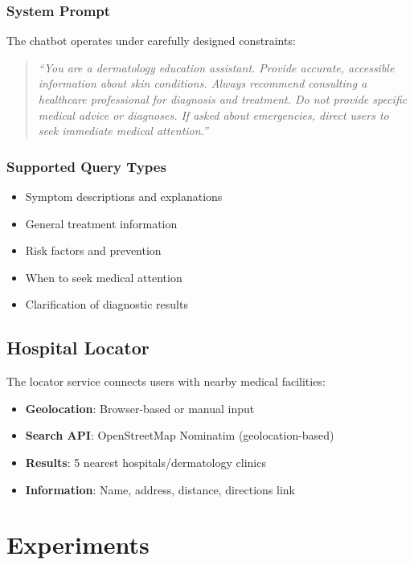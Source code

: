 \documentclass[ai,article,submit,pdftex,moreauthors]{Definitions/mdpi}
\begin{document}
\subsubsection{System Prompt}

The chatbot operates under carefully designed constraints:
\begin{quote}
\textit{``You are a dermatology education assistant. Provide accurate, accessible information about skin conditions. Always recommend consulting a healthcare professional for diagnosis and treatment. Do not provide specific medical advice or diagnoses. If asked about emergencies, direct users to seek immediate medical attention.''}
\end{quote}

\subsubsection{Supported Query Types}
\begin{itemize}[leftmargin=*, itemsep=2pt]
    \item Symptom descriptions and explanations
    \item General treatment information
    \item Risk factors and prevention
    \item When to seek medical attention
    \item Clarification of diagnostic results
\end{itemize}

\subsection{Hospital Locator}

The locator service connects users with nearby medical facilities:
\begin{itemize}[leftmargin=*, itemsep=2pt]
    \item \textbf{Geolocation}: Browser-based or manual input
    \item \textbf{Search API}: OpenStreetMap Nominatim (geolocation-based)
    \item \textbf{Results}: 5 nearest hospitals/dermatology clinics
    \item \textbf{Information}: Name, address, distance, directions link
\end{itemize}

\section{Experiments}
\end{document}
